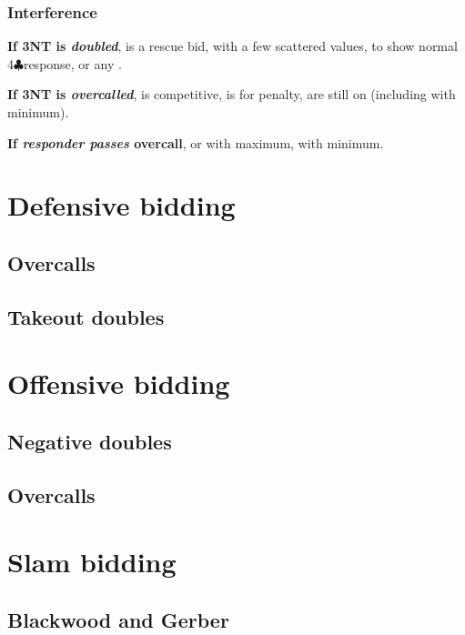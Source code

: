 \documentclass[oneside]{memoir}
\def\C{$\clubsuit$}
\begin{document}
\subsection{Interference}
\textbf{If 3NT is \emph{doubled}}, \textbid[lorange]{4\C} is a rescue bid,
 with a few scattered values, 
to show normal 4\C response, or any .

\noindent\textbf{If 3NT is \emph{overcalled}}, 
is competitive,  is for penalty,
 are still on (including
 with minimum).

\noindent\textbf{If \emph{responder passes} overcall}, 
or  with maximum,  with minimum.

\chapter{Defensive bidding}


\section{Overcalls}

\section{Takeout doubles}



\chapter{Offensive bidding}


\section{Negative doubles}

\section{Overcalls}


\chapter{Slam bidding}

\section{Blackwood and Gerber}
\end{document}
